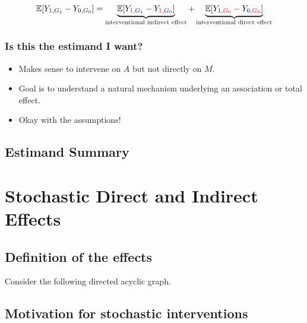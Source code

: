 \documentclass[
  12pt,
]{book}
\providecommand{\tightlist}{%
  \setlength{\itemsep}{0pt}\setlength{\parskip}{0pt}}
\theoremstyle{definition}
\theoremstyle{definition}
\theoremstyle{definition}
\newcommand{\E}{\mathbb{E}}
\newcommand{\1}{\mathbbm{1}}
\begin{document}
\begin{equation*}
  \E[Y_{1,G_1} - Y_{0,G_0}] = \underbrace{\E[Y_{\color{red}{1},
    \color{blue}{G_1}} -
    Y_{\color{red}{1},
    \color{blue}{G_0}}]}_{\text{interventional indirect effect}} +
    \underbrace{\E[Y_{\color{blue}{1},\color{red}{G_0}} -
    Y_{\color{blue}{0},
    \color{red}{G_0}}]}_{\text{interventional direct effect}}
\end{equation*}

\hypertarget{is-this-the-estimand-i-want-2}{%
\subsection{Is this the estimand I want?}\label{is-this-the-estimand-i-want-2}}

\begin{itemize}
\tightlist
\item
  Makes sense to intervene on \(A\) but not directly on \(M\).
\item
  Goal is to understand a natural mechanism underlying an association or total
  effect.
\item
  Okay with the assumptions!
\end{itemize}

\hypertarget{estimand-summary}{%
\section{Estimand Summary}\label{estimand-summary}}

\hypertarget{stochastic}{%
\chapter{Stochastic Direct and Indirect Effects}\label{stochastic}}

\hypertarget{definition-of-the-effects}{%
\section{Definition of the effects}\label{definition-of-the-effects}}

Consider the following directed acyclic graph.

\hypertarget{motivation-for-stochastic-interventions}{%
\section{Motivation for stochastic interventions}\label{motivation-for-stochastic-interventions}}
\end{document}
